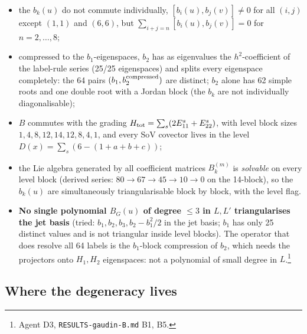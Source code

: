 \documentclass[11pt]{article}
\begin{document}
\begin{itemize}
\item the $b_k(u)$ do not commute individually, $[b_i(u),b_j(v)]\neq0$ for all $(i,j)$ except $(1,1)$ and $(6,6)$, but $\sum_{i+j=n}[b_i(u),b_j(v)]=0$ for $n=2,\dots,8$;
\item compressed to the $b_1$-eigenspaces, $b_2$ has as eigenvalues the $h^2$-coefficient of the label-rule series (25/25 eigenspaces) and splits every eigenspace completely: the 64 pairs $(b_1,b_2^{\rm compressed})$ are distinct; $b_2$ alone has 62 simple roots and one double root with a Jordan block (the $b_k$ are not individually diagonalisable);
\item $B$ commutes with the grading $H_{\rm tot}=\sum_s(2E^s_{11}+E^s_{22})$, with level block sizes $1,4,8,12,14,12,8,4,1$, and every SoV covector lives in the level $D(x)=\sum_s(6-(1+a+b+c))$;
\item the Lie algebra generated by all coefficient matrices $B^{(m)}_k$ is \emph{solvable} on every level block (derived series: $80\to67\to45\to10\to0$ on the 14-block), so the $b_k(u)$ are simultaneously triangularisable block by block, with the level flag.
\item \textbf{No single polynomial $B_G(u)$ of degree $\le3$ in $L,L'$ triangularises the jet basis} (tried: $b_1,b_2,b_3,b_2-b_1^2/2$ in the jet basis; $b_1$ has only 25 distinct values and is not triangular inside level blocks).
The operator that does resolve all 64 labels is the $b_1$-block compression of $b_2$, which needs the projectors onto $H_1,H_2$ eigenspaces: not a polynomial of small degree in $L$.\footnote{Agent D3, \texttt{RESULTS-\allowbreak{}gaudin-\allowbreak{}B.\allowbreak{}md} B1, B5.}
\end{itemize}

\subsection{Where the degeneracy lives}\label{sec:degeneracy}
\end{document}
